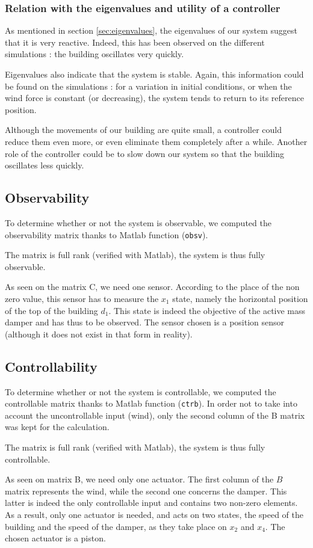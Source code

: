 \subsubsection{Relation with the eigenvalues and utility of a controller}
As mentioned in section \ref{sec:eigenvalues}, the eigenvalues of our system suggest that it is very reactive. Indeed, this has been observed on the different simulations : the building oscillates very quickly.\par
Eigenvalues also indicate that the system is stable. Again, this information could be found on the simulations : for a variation in initial conditions, or when the wind force is constant (or decreasing), the system tends to return to its reference position.\par
Although the movements of our building are quite small, a controller could reduce them even more, or even eliminate them completely after a while. Another role of the controller could be to slow down our system so that the building oscillates less quickly.

\subsection{Observability}
To determine whether or not the system is observable, we computed the observability matrix thanks to Matlab function (\texttt{obsv}).\par
The matrix is full rank (verified with Matlab), the system is thus fully observable.\par
As seen on the matrix C, we need one sensor. According to the place of the non zero value, this sensor has to measure the $x_1$ state, namely the horizontal position of the top of the building $d_1$. This state is indeed the objective of the active mass damper and has thus to be observed. The sensor chosen is a position sensor (although it does not exist in that form in reality).

\subsection{Controllability}
To determine whether or not the system is controllable, we computed the controllable matrix thanks to Matlab function (\texttt{ctrb}). In order not to take into account the uncontrollable input (wind), only the second column of the B matrix was kept for the calculation.\par
The matrix is full rank (verified with Matlab), the system is thus fully controllable.\par
As seen on matrix B, we need only one actuator. The first column of the $B$ matrix represents the wind, while the second one concerns the damper. This latter is indeed the only controllable input and contains two non-zero elements. As a result, only one actuator is needed, and acts on two states, the speed of the building and the speed of the damper, as they take place on $x_2$ and $x_4$. The chosen actuator is a piston.
